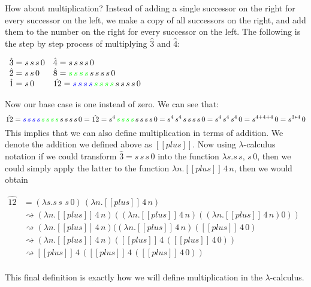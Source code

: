 \documentclass{article}
\newcommand {\redto}[0]{\rightsquigarrow}
\begin{document}
How about multiplication? Instead of adding a single successor on the
right for every successor on the left, we make a copy of all
successors on the right, and add them to the number on the right for
every successor on the left.  The following is the step by step
process of multiplying $\hat{3}$ and $\hat{4}$:
\begin{center}
  \begin{math}
    \begin{array}{lll}
      \hat{3} = s\,s\,s\,0 & \hat{4} = s\,s\,s\,s\,0\\
      \hat{2} = s\,s\,0    & \hat{8} = {\color{green}{s\,s\,s\,s}}\,s\,s\,s\,s\,0\\
      \hat{1} = s\,0       & \hat{12} = {\color{blue}{s\,s\,s\,s}}\,{\color{green}{s\,s\,s\,s}}\,s\,s\,s\,s\,0\\
    \end{array}
  \end{math}
\end{center}
Now our base case is one instead of zero.  We can see that:
\[\hat{12} = {\color{blue}{s\,s\,s\,s}}\,{\color{green}{s\,s\,s\,s}}\,s\,s\,s\,s\,0 = \hat{12} = s^4\,{\color{green}{s\,s\,s\,s}}\,s\,s\,s\,s\,0 =  s^4\,s^4\,s\,s\,s\,s\,0 = s^4\,s^4\,s^4\,0 = s^{4+4+4}\,0 = s^{3*4}\,0 \]
This implies that we can also define multiplication in terms of
addition.  We denote the addition we defined above as $[[plus]]$.  Now
using $\lambda$-calculus notation if we could transform $\hat{3} =
s\,s\,s\,0$ into the function $\lambda s.s\,s,\,s\,0$, then we could
simply apply the latter to the function $\lambda n.[[plus]]\,4\,n$, then
we would obtain 
\begin{center}
  \begin{math}
    \begin{array}{lll}
      \hat{12} 
      & = (\lambda s.s\,s\,\,s\,0)\,(\lambda n.[[plus]]\,4\,n) \\
      & \redto (\lambda n.[[plus]]\,4\,n) ((\lambda n.[[plus]]\,4\,n) ((\lambda n.[[plus]]\,4\,n) 0))\\
      & \redto (\lambda n.[[plus]]\,4\,n) ((\lambda n.[[plus]]\,4\,n) ([[plus]]\,4\,0)\\ 
      & \redto (\lambda n.[[plus]]\,4\,n) ([[plus]]\,4\,([[plus]]\,4\,0)) \\ 
      & \redto [[plus]]\,4\,([[plus]]\,4\,([[plus]]\,4\,0)) \\ 
    \end{array}
  \end{math}
\end{center}
This final definition is exactly how we will define multiplication in
the $\lambda$-calculus.
\end{document}
